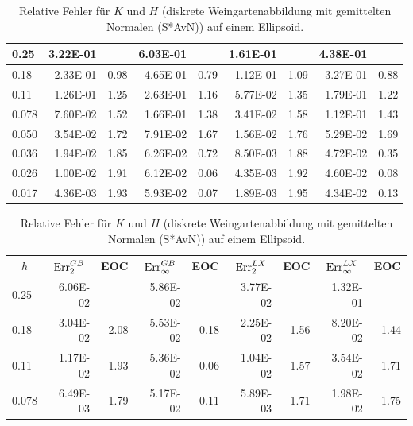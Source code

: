 \begin{table}[htbp]
\begin{tabular}{|l|r|r|r|r|r|r|r|r|}
           0.25 & 3.22E-01 & \multicolumn{1}{l|}{} & 6.03E-01 & \multicolumn{1}{l|}{} & 1.61E-01 & \multicolumn{1}{l|}{} & 4.38E-01 & \multicolumn{1}{l|}{} \\ \hline
            0.18 & 2.33E-01 & 0.98 & 4.65E-01 & 0.79 & 1.12E-01 & 1.09 & 3.27E-01 & 0.88 \\ \hline
            0.11 & 1.26E-01 & 1.25 & 2.63E-01 & 1.16 & 5.77E-02 & 1.35 & 1.79E-01 & 1.22 \\ \hline
            0.078 & 7.60E-02 & 1.52 & 1.66E-01 & 1.38 & 3.41E-02 & 1.58 & 1.12E-01 & 1.43 \\ \hline
            0.050 & 3.54E-02 & 1.72 & 7.91E-02 & 1.67 & 1.56E-02 & 1.76 & 5.29E-02 & 1.69 \\ \hline
            0.036 & 1.94E-02 & 1.85 & 6.26E-02 & 0.72 & 8.50E-03 & 1.88 & 4.72E-02 & 0.35 \\ \hline
            0.026 & 1.00E-02 & 1.91 & 6.12E-02 & 0.06 & 4.35E-03 & 1.92 & 4.60E-02 & 0.08 \\ \hline
            0.017 & 4.36E-03 & 1.93 & 5.93E-02 & 0.07 & 1.89E-03 & 1.95 & 4.34E-02 & 0.13 \\ \hline
      \end{tabular}
      \caption[Weingarten auf einem Ellipsoid (S*AvN)]{Relative Fehler für \( K \) und \( H \) (diskrete Weingartenabbildung mit gemittelten
      Normalen (S*AvN)) auf einem Ellipsoid.}
      \label{tabHeineCWeingartenAvN}
      \vspace{10pt}
    \centering
      \begin{tabular}{|l|r|r|r|r|r|r|r|r|}
      \hline
      \multicolumn{1}{|c|}{\rule{0pt}{11pt}\( h \)} & \multicolumn{1}{c|}{\( \text{Err}_{2}^{GB} \)} & \multicolumn{1}{c|}{EOC} & 
           \multicolumn{1}{c|}{\( \text{Err}_{\infty}^{GB} \)} & \multicolumn{1}{c|}{EOC} & \multicolumn{1}{c|}{\( \text{Err}_{2}^{LX} \)} &
           \multicolumn{1}{c|}{EOC} & \multicolumn{1}{c|}{\( \text{Err}_{\infty}^{LX} \)} & \multicolumn{1}{c|}{EOC} \\ \hline
           0.25 & 6.06E-02 & \multicolumn{1}{l|}{} & 5.86E-02 & \multicolumn{1}{l|}{} & 3.77E-02 & \multicolumn{1}{l|}{} & 1.32E-01 & \multicolumn{1}{l|}{} \\ \hline
            0.18 & 3.04E-02 & 2.08 & 5.53E-02 & 0.18 & 2.25E-02 & 1.56 & 8.20E-02 & 1.44 \\ \hline
            0.11 & 1.17E-02 & 1.93 & 5.36E-02 & 0.06 & 1.04E-02 & 1.57 & 3.54E-02 & 1.71 \\ \hline
            0.078 & 6.49E-03 & 1.79 & 5.17E-02 & 0.11 & 5.89E-03 & 1.71 & 1.98E-02 & 1.75 \\ \hline

\end{tabular}
\end{table}
